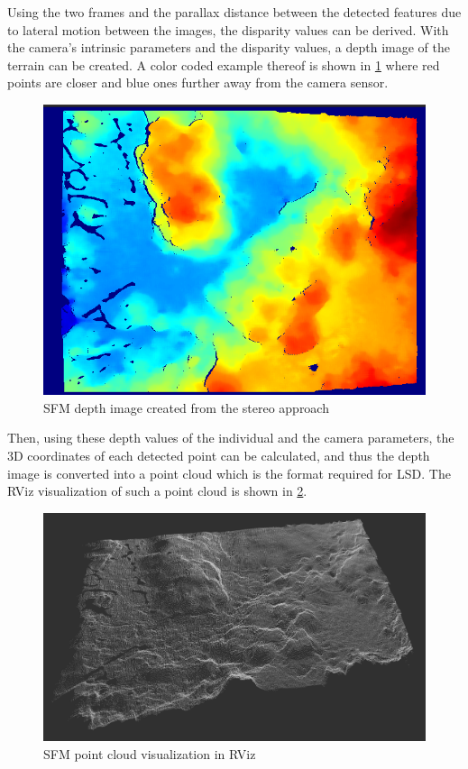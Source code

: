 Using the two frames and the parallax distance between the detected features due to lateral motion between the images, the disparity values can be derived. With the camera's intrinsic parameters and the disparity values, a depth image of the terrain can be created. A color coded example thereof is shown in \cref{fig:sfm_depth_image} where red points are closer and blue ones further away from the camera sensor.

\begin{figure}[h]
\centering
\includegraphics[scale=0.45]{images/system_overview/sfm_depth_image.png}
\caption{SFM depth image created from the stereo approach}
\label{fig:sfm_depth_image}
\end{figure}

Then, using these depth values of the individual and the camera parameters, the 3D coordinates of each detected point can be calculated, and thus the depth image is converted into a point cloud which is the format required for LSD. The RViz visualization of such a point cloud is shown in \cref{fig:sfm_point_cloud}.


\begin{figure}[h]
\centering
\includegraphics[scale=0.2]{images/system_overview/sfm_depth_map.png}
\caption{SFM point cloud visualization in RViz}
\label{fig:sfm_point_cloud}
\end{figure}

